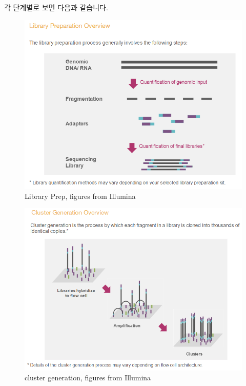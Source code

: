 \documentclass[
]{book}
\begin{document}
각 단계별로 보면 다음과 같습니다.

\begin{figure}
\centering
\includegraphics[width=5.20833in,height=\textheight]{images/12/illuminaseq_lib_pre.png}
\caption{Library Prep, figures from Illumina}
\end{figure}

\begin{figure}
\centering
\includegraphics[width=5.20833in,height=\textheight]{images/12/illuminaseq_cluster_gen.png}
\caption{cluster generation, figures from Illumina}
\end{figure}
\end{document}
